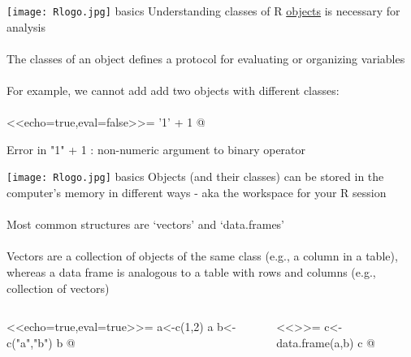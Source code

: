 \documentclass[xcolor=svgnames]{beamer}
\begin{document}
\begin{frame}[fragile,t]{\texttt{[image: Rlogo.jpg]} \hspace{0.01in} basics}
Understanding classes of R \href{http://cran.r-project.org/doc/manuals/r-release/R-lang.html#Vector-objects}{objects} is necessary for analysis \\~\\
The classes of an object defines a protocol for evaluating or organizing variables\\~\\
For example, we cannot add add two objects with different classes:\\~\\
<<echo=true,eval=false>>=
'1' + 1
@
\begin{Schunk}
\begin{Soutput}
Error in "1" + 1 : non-numeric argument to binary operator
\end{Soutput}
\end{Schunk}
\end{frame}

\begin{frame}[fragile]{\texttt{[image: Rlogo.jpg]} \hspace{0.01in} basics}
Objects (and their classes) can be stored in the computer's memory in different ways - aka the workspace for your R session\\~\\
Most common structures are `vectors' and `data.frames'\\~\\
Vectors are a collection of objects of the same class (e.g., a column in a table), whereas a data frame is analogous to a table with rows and columns (e.g., collection of vectors)
\begin{columns}[t]
\begin{column}{0.45\textwidth}
<<echo=true,eval=true>>=
a<-c(1,2)
a
b<-c("a","b")
b
@
\end{column}
\begin{column}{0.45\textwidth}
<<>>=
c<-data.frame(a,b)
c
@
\end{column}
\end{columns}
\end{frame}
\end{document}
